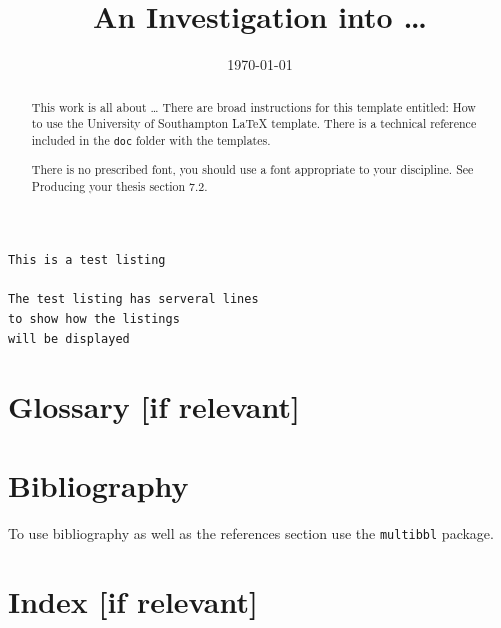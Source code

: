 \documentclass[sotoncolour]{uosthesis}      %
\title      {An Investigation into \dots}
\date       {\today}
\begin{document}
\copyrightDeclaration{} %
\raggedright                  %
\frontmatter
\maketitle
\begin{abstract}
This work is all about \dots
There are broad instructions for this template entitled: How to use the University of Southampton LaTeX template. There is a technical reference included in the \texttt{doc} folder with the templates.

There is no prescribed font, you should use a font appropriate to your discipline.  See Producing your thesis section 7.2.
\end{abstract}
\tableofcontents
\listoffigures
\listoftables
\lstlistoflistings
\listofaddmaterial
{}
\mainmatter


\begin{lstlisting}[caption=Listing of what an example listing would be like]
This is a test listing

The test listing has serveral lines
to show how the listings
will be displayed
\end{lstlisting}
\appendix

\backmatter
\chapter{Glossary [if relevant]}


\chapter{Bibliography}
To use bibliography as well as the references section use the \texttt{multibbl} package.
\chapter{Index [if relevant]}
\end{document}
